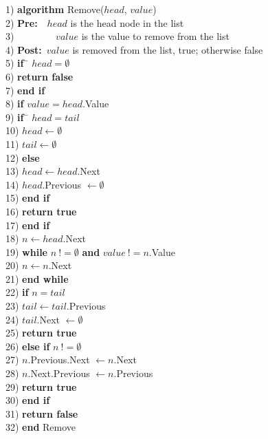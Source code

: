 \begin{tabbing}
1)  \textbf{alg}\= \textbf{orithm} Remove($head$, $value$) \\
2)  \> \textbf{Pre:}~~$head$ is the head node in the list \\
3)  \> ~~~~~~~~$value$ is the value to remove from the list \\
4)  \> \textbf{Post:}~$value$ is removed from the list, true; otherwise false \\
5)  \> \textbf{if}~\= $head = \emptyset$ \\
6)  \> \> \textbf{return false} \\
7)  \> \textbf{end if} \\
8)  \> \textbf{if} $value = head$.Value \\
9)  \> \> \textbf{if}~\= $head = tail$ \\
10) \> \> \> $head \leftarrow \emptyset$ \\
11) \> \> \> $tail \leftarrow \emptyset$ \\
12) \> \> \textbf{else} \\
13) \> \> \> $head \leftarrow head$.Next \\
14) \> \> \> $head$.Previous $\leftarrow \emptyset$ \\
15) \> \> \textbf{end if} \\
16) \> \> \textbf{return true} \\
17) \> \textbf{end if} \\
18) \> $n \leftarrow head$.Next \\
19) \> \textbf{while} $n~!= \emptyset$ \textbf{and} $value~!= n$.Value \\
20) \> \> $n \leftarrow n$.Next \\
21) \> \textbf{end while} \\
22) \> \textbf{if} $n = tail$ \\
23) \> \> $tail \leftarrow tail$.Previous \\
24) \> \> $tail$.Next $\leftarrow \emptyset$ \\
25) \> \> \textbf{return true} \\
26) \> \textbf{else if} $n~!= \emptyset$ \\
27) \> \> $n$.Previous.Next $\leftarrow n$.Next \\
28) \> \> $n$.Next.Previous $\leftarrow n$.Previous \\
29) \> \> \textbf{return true} \\
30) \> \textbf{end if} \\
31) \> \textbf{return false} \\
32) \textbf{end} Remove \\
\end{tabbing}
